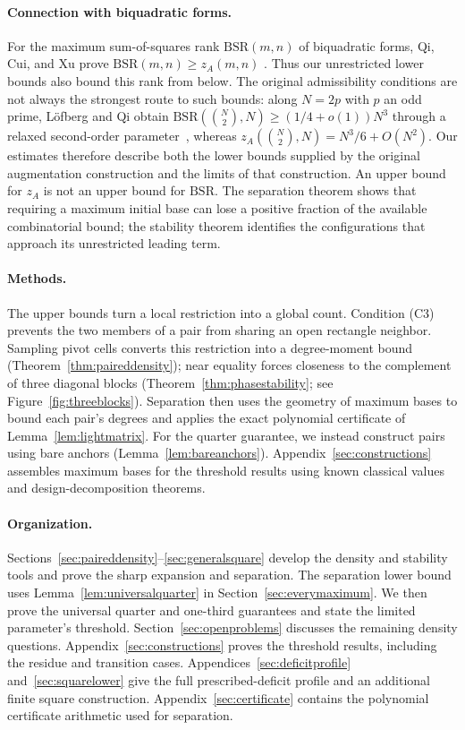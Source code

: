 \documentclass[11pt]{article}
\newcommand{\za}{z_A}
\begin{document}
\paragraph{Connection with biquadratic forms.}
For the maximum sum-of-squares rank $\mathrm{BSR}(m,n)$ of biquadratic
forms, Qi, Cui, and Xu prove $\mathrm{BSR}(m,n)\ge\za(m,n)$
\cite[Theorem~2.4]{framework}. Thus our unrestricted lower bounds also
bound this rank from below. The original admissibility conditions are
not always the strongest route to such bounds: along $N=2p$ with $p$
an odd prime, L\"ofberg and Qi obtain
$\mathrm{BSR}(\binom N2,N)\ge(1/4+o(1))N^3$ through a relaxed
second-order parameter~\cite[Theorems~3.3 and~7.5]{weakincidence}, whereas
$\za(\binom N2,N)=N^3/6+O(N^2)$.
Our estimates therefore describe both the lower bounds supplied by the
original augmentation construction and the limits of that construction.
An upper bound for $\za$ is not an upper bound for $\mathrm{BSR}$.
The separation theorem shows that requiring a maximum initial base can
lose a positive fraction of the available combinatorial bound; the
stability theorem identifies the configurations that approach its
unrestricted leading term.

\paragraph{Methods.}
The upper bounds turn a local restriction into a global count.
Condition (C3) prevents the two members of a pair from sharing an open
rectangle neighbor. Sampling pivot cells converts this restriction into
a degree-moment bound (Theorem~\ref{thm:paireddensity}); near equality
forces closeness to the complement of three diagonal blocks
(Theorem~\ref{thm:phasestability}; see Figure~\ref{fig:threeblocks}).
Separation then uses the geometry of
maximum bases to bound each pair's degrees and applies the exact
polynomial certificate of Lemma~\ref{lem:lightmatrix}.
For the quarter guarantee, we instead construct pairs using bare anchors
(Lemma~\ref{lem:bareanchors}). Appendix~\ref{sec:constructions} assembles
maximum bases for the threshold results using known classical values
and design-decomposition theorems.

\paragraph{Organization.}
Sections~\ref{sec:paireddensity}--\ref{sec:generalsquare} develop the
density and stability tools and prove the sharp expansion and separation.
The separation lower bound uses Lemma~\ref{lem:universalquarter} in
Section~\ref{sec:everymaximum}. We then prove the universal quarter
and one-third guarantees and state the limited parameter's threshold.
Section~\ref{sec:openproblems} discusses the remaining density questions.
Appendix~\ref{sec:constructions} proves the threshold results, including
the residue and transition cases. Appendices~\ref{sec:deficitprofile}
and~\ref{sec:squarelower} give the full prescribed-deficit profile and
an additional finite square construction. Appendix~\ref{sec:certificate}
contains the polynomial certificate arithmetic used for separation.
\end{document}
